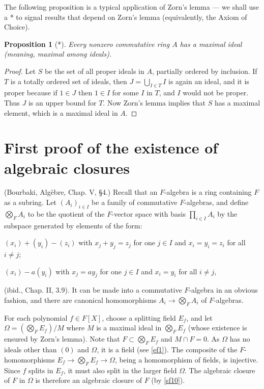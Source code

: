 \documentclass[a4paper,11pt,final,openany]{memoir}
\newtheorem{proposition}[X]{Proposition}
\theoremstyle{nonumberplain}
\newtheorem{proof}{Proof.}
\begin{document}
The following proposition is a typical application of Zorn's lemma --- we
shall use a * to signal results that depend on Zorn's lemma (equivalently, the
Axiom of Choice).

\begin{proposition}
[*]\label{sf15}Every nonzero commutative ring $A$ has a maximal ideal
(meaning, maximal among  ideals).
\end{proposition}

\begin{proof}
Let $S$ be the set of all proper ideals in $A$, partially ordered by
inclusion. If $T$ is a totally ordered set of ideals, then $J=\bigcup_{I\in
T}I$ is again an ideal, and it is proper because if $1\in J$ then $1\in I$ for
some $I$ in $T$, and $I$ would not be proper. Thus $J$ is an upper bound for
$T$. Now Zorn's lemma implies that $S$ has a maximal element, which is a
maximal ideal in $A$.
\end{proof}

\section{First proof of the existence of algebraic closures}

(Bourbaki, Alg\`{e}bre, Chap. V, \S 4.) Recall that an $F$-algebra is a ring
containing $F$ as a subring. Let $(A_{i})_{i\in I}$ be a family of commutative
$F$-algebras, and define $\bigotimes_{F}A_{i}$ to be the quotient of the
$F$-vector space with basis $\prod\nolimits_{i\in I}A_{i}$ by the subspace
generated by elements of the form:

$(x_{i})+(y_{i})-(z_{i})$ with $x_{j}+y_{j}=z_{j}$ for one $j\in I$ and
$x_{i}=y_{i}=z_{i}$ for all $i\neq j$;

$(x_{i})-a(y_{i})$ with $x_{j}=ay_{j}$ for one $j\in I$ and $x_{i}=y_{i}$ for
all $i\neq j$,

\noindent(ibid., Chap. II, 3.9). It can be made into a commutative $F$-algebra
in an obvious fashion, and there are canonical homomorphisms $A_{i}%
\rightarrow\bigotimes\nolimits_{F}A_{i}$ of $F$-algebras.

For each polynomial $f\in F[X]$, choose a splitting field $E_{f}$, and let
$\Omega=(\bigotimes\nolimits_{F}E_{f})/M$ where $M$ is a maximal ideal in
$\bigotimes_{F}E_{f}$ (whose existence is ensured by Zorn's lemma). Note that
$F\subset\bigotimes\nolimits_{F}E_{f}$ and $M\cap F=0$. As $\Omega$ has no
ideals other than $(0)$ and $\Omega$, it is a field (see \ref{ef1}). The
composite of the $F$-homomorphisms $E_{f}\rightarrow\bigotimes\nolimits_{F}%
E_{f}\rightarrow\Omega$, being a homomorphism of fields, is injective. Since
$f$ splits in $E_{f}$, it must also split in the larger field $\Omega$. The
algebraic closure of $F$ in $\Omega$ is therefore an algebraic closure of $F$
(by \ref{sf10}).
\end{document}
